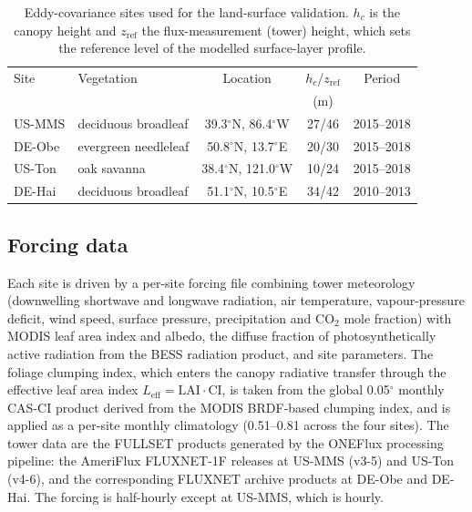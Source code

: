 \begin{table}[h]\centering\footnotesize
\caption{Eddy-covariance sites used for the land-surface validation. $h_c$ is the
canopy height and $z_{\mathrm{ref}}$ the flux-measurement (tower) height, which
sets the reference level of the modelled surface-layer profile.}\label{tab:ecsites}
\begin{tabular}{@{}llccc@{}}
\toprule
Site & Vegetation & Location & $h_c$/$z_{\mathrm{ref}}$ & Period \\
     &            &          & (m) & \\
\midrule
US-MMS\cite{USMMS} & deciduous broadleaf  & 39.3$^\circ$N, 86.4$^\circ$W  & 27/46 & 2015--2018 \\
DE-Obe\cite{DEObe} & evergreen needleleaf & 50.8$^\circ$N, 13.7$^\circ$E  & 20/30 & 2015--2018 \\
US-Ton\cite{USTon} & oak savanna          & 38.4$^\circ$N, 121.0$^\circ$W & 10/24 & 2015--2018 \\
DE-Hai\cite{DEHai} & deciduous broadleaf  & 51.1$^\circ$N, 10.5$^\circ$E  & 34/42 & 2010--2013 \\
\bottomrule
\end{tabular}
\end{table}

\subsection{Forcing data}

Each site is driven by a per-site forcing file combining tower meteorology
(downwelling shortwave and longwave radiation, air temperature, vapour-pressure
deficit, wind speed, surface pressure, precipitation and CO$_2$ mole fraction)
with MODIS leaf area index\cite{Myneni2002} and albedo\cite{Schaaf2002}, the
diffuse fraction of photosynthetically active radiation from the BESS radiation
product\cite{Ryu2018}, and site parameters. The foliage clumping index, which
enters the canopy radiative transfer through the effective leaf area index
$L_{\mathrm{eff}} = \mathrm{LAI}\cdot\mathrm{CI}$, is taken from the global
0.05$^\circ$ monthly CAS-CI product\cite{LiFang2022} derived from the MODIS
BRDF-based clumping index\cite{Wei2019}, and is applied as a per-site monthly
climatology (0.51--0.81 across the four sites). The tower data are the FULLSET
products generated by the ONEFlux processing pipeline\cite{Pastorello2020}: the
AmeriFlux FLUXNET-1F releases at US-MMS (v3-5)\cite{USMMS} and US-Ton
(v4-6)\cite{USTon}, and the corresponding FLUXNET archive products at
DE-Obe\cite{DEObe} and DE-Hai\cite{DEHai}. The forcing is half-hourly except at
US-MMS, which is hourly.

